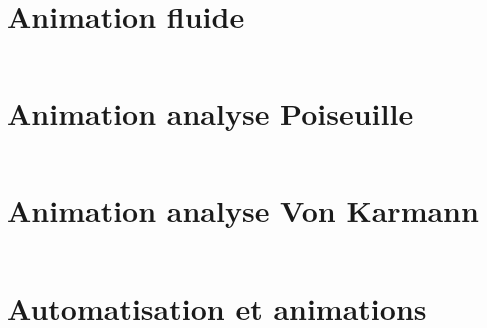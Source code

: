 \documentclass[unnumsec,webpdf,contemporary,large]{oup-authoring-template}%
\theoremstyle{thmstyleone}%
\theoremstyle{thmstyletwo}%
\theoremstyle{thmstylethree}%
\begin{document}
    \section{Animation fluide}
      \inputminted{python}{Codes/anim.py}
    
    \vfill
    \newpage
    \section{Animation analyse Poiseuille}
      \inputminted{python}{Codes/sprofile.py}

    \vfill
    \newpage    
    \section{Animation analyse Von Karmann}
      \inputminted{python}{Codes/interesting.py}
      
    \vfill
    \newpage   
    \section{Automatisation et animations}
      \inputminted{makefile}{Codes/makefile}
\end{document}
